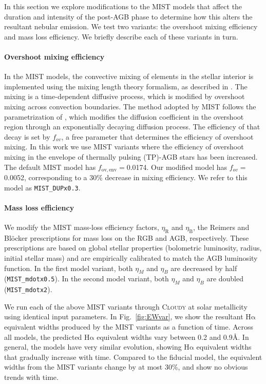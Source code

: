 \documentclass[preprint2]{aastex62}
\newcommand{\Cloudy}{\textsc{Cloudy}\xspace}
\newcommand{\ha}{\ensuremath{\mathrm{H\alpha}}\xspace}
\newcommand{\ang}{\ensuremath{\mbox{\AA}}\xspace}
\begin{document}
In this section we explore modifications to the MIST models that affect the duration and intensity of the post-AGB phase to determine how this alters the resultant nebular emission. We test two variants: the overshoot mixing efficiency and mass loss efficiency. We briefly describe each of these variants in turn.

\paragraph{Overshoot mixing efficiency} In the MIST models, the convective mixing of elements in the stellar interior is implemented using the mixing length theory formalism, as described in \citet{Choi+2016}. The mixing is a time-dependent diffusive process, which is modified by overshoot mixing across convection boundaries. The method adopted by MIST follows the parametrization of \citet{Herwig+2000}, which modifies the diffusion coefficient in the overshoot region through an exponentially decaying diffusion process. The efficiency of that decay is set by $f_{ov}$, a free parameter that determines the efficiency of overshoot mixing. In this work we use MIST variants where the efficiency of overshoot mixing in the envelope of thermally pulsing (TP)-AGB stars has been increased. The default MIST model has $f_{\mathrm{ov, env}}=$0.0174. Our modified model has $f_{ov}=$0.0052, corresponding to a 30\% decrease in mixing efficiency. We refer to this model as {\tt MIST\_DUPx0.3}.

\paragraph{Mass loss efficiency} We modify the MIST mass-loss efficiency factors, $\eta_\mathrm{R}$ and $\eta_\mathrm{B}$, the Reimers and Bl{\"o}cker prescriptions for mass loss on the RGB and AGB, respectively. These prescriptions are based on global stellar properties (bolometric luminosity, radius, initial stellar mass) and are empirically calibrated to match the AGB luminosity function. In the first model variant, both $\eta_M$ and $\eta_B$ are decreased by half ({\tt MIST\_mdotx0.5}). In the second model variant, both $\eta_M$ and $\eta_B$ are doubled ({\tt MIST\_mdotx2}).

We run each of the above MIST variants through \Cloudy at solar metallicity using identical input parameters. In Fig.~\ref{fig:EWvar}, we show the resultant \ha equivalent widths produced by the MIST variants as a function of time. Across all models, the predicted \ha equivalent widths vary between 0.2 and 0.9\ang. In general, the models have very similar evolution, showing \ha equivalent widths that gradually increase with time. Compared to the fiducial model, the equivalent widths from the MIST variants change by at most 30\%, and show no obvious trends with time.
\end{document}
